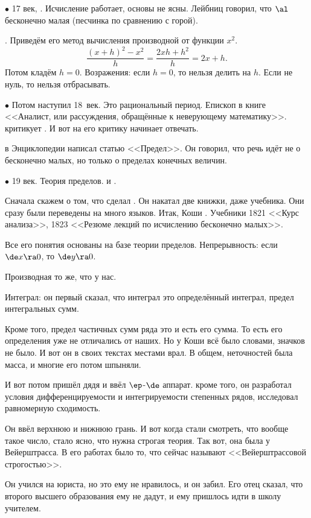 \documentclass[a4paper,oneside,fleqn,10pt]{article}
\begin{document}
$\bullet$ 17 век, . Исчисление работает, основы не
ясны. Лейбниц говорил, что $\al$ бесконечно малая (песчинка по
сравнению с горой).

. Приведём его метод вычисления производной от функции
$x^2$.
$$\frac{(x+h)^2 - x^2}{h} = \frac{2xh + h^2}{h} = 2x + h.$$ Потом
кладём $h = 0$. Возражения: если $h = 0$, то нельзя делить на
$h$. Если не нуль, то нельзя отбрасывать.

$\bullet$ Потом наступил 18~век. Это рациональный период. Епископ
 в книге <<Аналист, или рассуждения, обращённые к
неверующему математику>>.  критикует . И вот на
его критику начинает отвечать.

 в Энциклопедии написал статью <<Предел>>. Он говорил,
что речь идёт не о бесконечно малых, но только о пределах конечных
величин.

$\bullet$ 19 век. Теория пределов.  и .

Сначала скажем о том, что сделал .  Он накатал две книжки,
даже учебника. Они сразу были переведены на много языков. Итак, Коши
. Учебники 1821 <<Курс анализа>>, 1823 <<Резюме лекций
по исчислению бесконечно малых>>.

Все его понятия основаны на базе теории пределов.  Непрерывность: если
$\de x \ra 0$, то $\de y \ra 0$.

Производная то же, что у нас.

Интеграл: он первый сказал, что интеграл это определённый интеграл,
предел интегральных сумм.

Кроме того, предел частичных сумм ряда это и есть его сумма. То есть
его определения уже не отличались от наших. Но у Коши всё было
словами, значков не было.  И вот он в своих текстах местами врал. В
общем, неточностей была масса, и многие его потом шпыняли.

И вот потом пришёл дядя   и ввёл
$\ep$-$\de$ аппарат.  кроме того, он разработал условия
дифференцируемости и интегрируемости степенных рядов, исследовал
равномерную сходимость.

Он ввёл верхнюю и нижнюю грань. И вот когда стали смотреть, что вообще
такое число, стало ясно, что нужна строгая теория. Так вот, она была у
Вейерштрасса. В его работах было то, что сейчас называют
<<Вейерштрассовой строгостью>>.

Он учился на юриста, но это ему не нравилось, и он забил.  Его отец
сказал, что второго высшего образования ему не дадут, и ему пришлось
идти в школу учителем.
\end{document}
